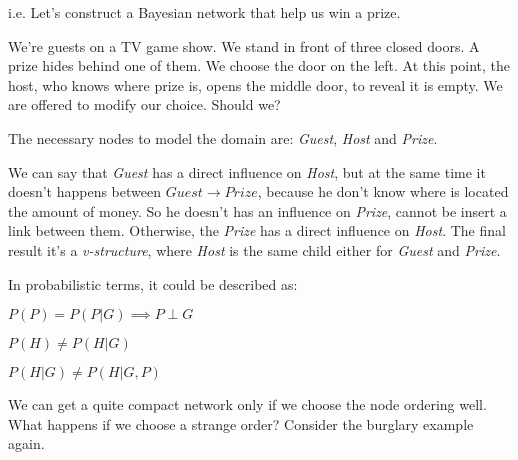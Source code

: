 \begin{example}
    i.e. Let's construct a Bayesian network that help us win a prize. \vspace{3.5pt}

    We're guests on a TV game show. We stand in front of three closed doors. A prize hides behind one of them. We choose the door on the left. At this point, the host,
    who knows where prize is, opens the middle door, to reveal it is empty. We are offered to modify our choice. Should we? \vspace{7pt}

    The necessary nodes to model the domain are: \textit{Guest}, \textit{Host} and \textit{Prize}. \vspace{3.5pt}

    We can say that \textit{Guest} has a direct influence on \textit{Host}, but at the same time it doesn't happens between \textit{$Guest \rightarrow Prize$},
    because he don't know where is located the amount of money. So he doesn't has an influence on \textit{Prize}, cannot be insert a link between them. Otherwise, the \textit{Prize}
    has a direct influence on \textit{Host}. The final result it's a \textit{v-structure}, where \textit{Host} is the same child either for \textit{Guest} and \textit{Prize}. \vspace{3.5pt}
    
    In probabilistic terms, it could be described as: \vspace{3.5pt}
    
    $P(P) = P(P|G) \implies P \perp G$

    $P(H) \neq P(H|G)$

    $P(H|G) \neq P(H|G, P)$
\end{example}
We can get a quite compact network only if we choose the node ordering well. What happens if we choose a strange order? Consider the burglary example again.
